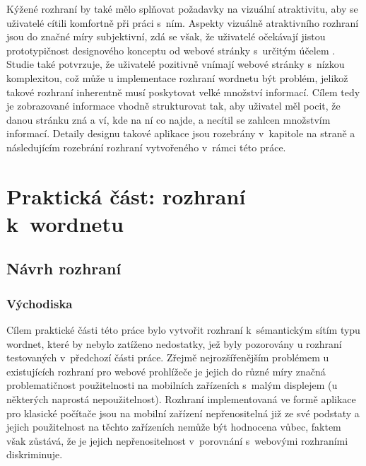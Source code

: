 \documentclass[a4paper, 11pt, oneside, showtrims]{book}
\newcommand{\itNameRef}[1]{\textit{\nameref{#1}}}
\begin{document}
			Kýžené rozhraní by také mělo splňovat požadavky na vizuální atraktivitu, aby se uživatelé cítili komfortně při práci s~ním. Aspekty vizuálně atraktivního rozhraní jsou do značné míry subjektivní, zdá se však, že uživatelé očekávají jistou prototypičnost designového konceptu od webové stránky s~určitým účelem \parencite{walker2013simple, tuch2012role}. Studie \parencite{tuch2012role} také potvrzuje, že uživatelé pozitivně vnímají webové stránky s~nízkou komplexitou, což může u implementace rozhraní wordnetu být problém, jelikož takové rozhraní inherentně musí poskytovat velké množství informací. Cílem tedy je zobrazované informace vhodně strukturovat tak, aby uživatel měl pocit, že danou stránku zná a ví, kde na ní co najde, a necítil se zahlcen množstvím informací. Detaily designu takové aplikace jsou rozebrány v~kapitole \itNameRef{cha:navrh} na straně \pageref{cha:navrh} a následujícím rozebrání rozhraní vytvořeného v~rámci této práce.

	\part{Praktická část: rozhraní k~wordnetu}
	\label{part:drei}

		\chapter{Návrh rozhraní}
		\label{cha:navrh}


			\section{Východiska}

				Cílem praktické části této práce bylo vytvořit rozhraní k~sémantickým sítím typu wordnet, které by nebylo zatíženo nedostatky, jež byly pozorovány u rozhraní testovaných v~předchozí části práce. Zřejmě nejrozšířenějším problémem u existujících rozhraní pro webové prohlížeče je jejich do různé míry značná problematičnost použitelnosti na mobilních zařízeních s~malým displejem (u některých naprostá nepoužitelnost). Rozhraní implementovaná ve formě aplikace pro klasické počítače jsou na mobilní zařízení nepřenositelná již ze své podstaty a jejich použitelnost na těchto zařízeních nemůže být hodnocena vůbec, faktem však zůstává, že je jejich nepřenositelnost v~porovnání s~webovými rozhraními diskriminuje. 
\end{document}
